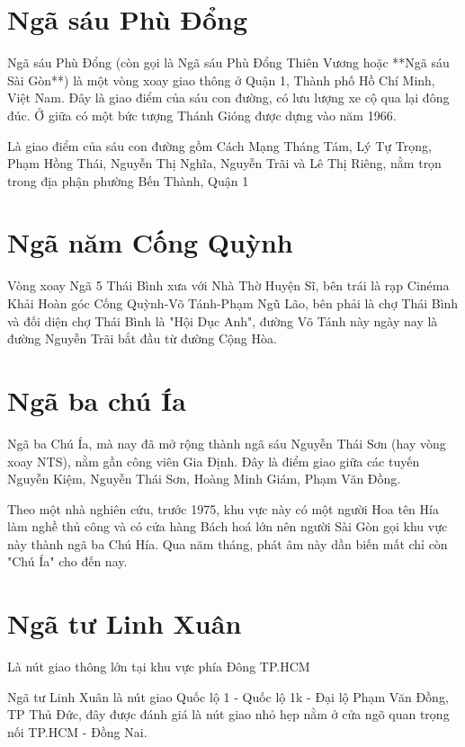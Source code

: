 \section{Ngã sáu Phù Đổng}

Ngã sáu Phù Đổng (còn gọi là Ngã sáu Phù Đổng Thiên Vương hoặc **Ngã sáu Sài Gòn**) là một vòng xoay giao thông ở Quận 1, Thành phố Hồ Chí Minh, Việt Nam. Đây là giao điểm của sáu con đường, có lưu lượng xe cộ qua lại đông đúc. Ở giữa có một bức tượng Thánh Gióng được dựng vào năm 1966.

Là giao điểm của sáu con đường gồm Cách Mạng Tháng Tám, Lý Tự Trọng, Phạm Hồng Thái, Nguyễn Thị Nghĩa, Nguyễn Trãi và Lê Thị Riêng, nằm trọn trong địa phận phường Bến Thành, Quận 1

\section{Ngã năm Cống Quỳnh}

Vòng xoay Ngã 5 Thái Bình xưa với Nhà Thờ Huyện Sĩ, bên trái là rạp Cinéma Khải Hoàn góc Cống Quỳnh-Võ Tánh-Phạm Ngũ Lão, bên phải là chợ Thái Bình và đối diện chợ Thái Bình là "Hội Dục Anh", đường Võ Tánh này ngày nay là đường Nguyễn Trãi bắt đầu từ đường Cộng Hòa.

\section{Ngã ba chú Ía}

Ngã ba Chú Ía, mà nay đã mở rộng thành ngã sáu Nguyễn Thái Sơn (hay vòng xoay NTS), nằm gần công viên Gia Định. Đây là điểm giao giữa các tuyến Nguyễn Kiệm, Nguyễn Thái Sơn, Hoàng Minh Giám, Phạm Văn Đồng.

Theo một nhà nghiên cứu, trước 1975, khu vực này có một người Hoa tên Hía làm nghề thủ công và có cửa hàng Bách hoá lớn nên người Sài Gòn gọi khu vực này thành ngã ba Chú Hía. Qua năm tháng, phát âm này dần biến mất chỉ còn "Chú Ía" cho đến nay.

\section{Ngã tư Linh Xuân}

Là nút giao thông lớn tại khu vực phía Đông TP.HCM

Ngã tư Linh Xuân là nút giao Quốc lộ 1 - Quốc lộ 1k - Đại lộ Phạm Văn Đồng, TP Thủ Đức, đây được đánh giá là nút giao nhỏ hẹp nằm ở cửa ngõ quan trọng nối TP.HCM - Đồng Nai.

